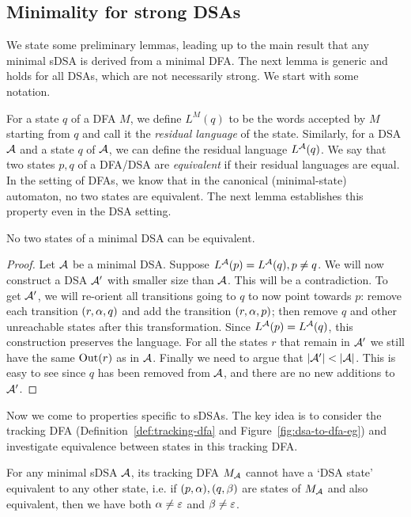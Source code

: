 \subsection{Minimality for strong DSAs}
\label{sec:sDSA-minimality}

 We state some preliminary lemmas, leading up to the main result that any minimal sDSA is derived from a minimal DFA. The next lemma is generic and holds for all DSAs, which are not necessarily strong. We start with some notation. 

 For a state $q$ of a DFA $M$, we define $L^M(q)$ to be the words accepted by $M$ starting from $q$ and call it the \emph{residual language} of the state. Similarly, for a DSA $\mathcal{A}$ and a state $q$ of $\mathcal{A}$, we can define the residual language $L^{\mathcal{A}}(q)$.
 We say that two states $p, q$ of a DFA/DSA are \emph{equivalent} if their residual languages are equal. In the setting of DFAs, we know that in the canonical (minimal-state) automaton, no two states are equivalent. The next lemma establishes this property even in the DSA setting.

\begin{lemma}\label{lem:minimal-dsa-no-equivalent-states}
No two states of a minimal DSA can be equivalent.
\end{lemma}

\begin{proof}
  Let $\mathcal{A}$ be a minimal DSA. Suppose 
  $L^{\mathcal{A}}(p) = L^{\mathcal{A}}(q), p \ne q$. We will
  now construct a DSA $\mathcal{A}'$ with smaller size
  than $\mathcal{A}$. This will be a contradiction. To get $\mathcal{A}'$, we will
  re-orient all transitions going to $q$ to now point towards $p$:
  remove each 
  transition $(r, \alpha, q)$ and add the transition $(r, \alpha, p)$; then
  remove $q$ and other unreachable states after this
  transformation. Since $L^{\mathcal{A}}(p) = L^{\mathcal{A}}(q)$, this construction
  preserves the language. For all the states $r$ that remain in $\mathcal{A}'$ we
  still have the same $\operatorname{Out}(r)$ as in $\mathcal{A}$. Finally we need to argue that $|\mathcal{A}'| <
  |\mathcal{A}|$. This is easy to see since $q$ has been removed from $\mathcal{A}$,
  and there are no new additions to $\mathcal{A}'$.
\end{proof}

   
Now we come to properties specific to sDSAs. The key idea is to consider the tracking DFA (Definition~\ref{def:tracking-dfa} and Figure~\ref{fig:dsa-to-dfa-eg}) and investigate equivalence between states in this tracking DFA. 

\begin{lemma}\label{lem:sdsa-equivalent-states}
For any minimal sDSA $\mathcal{A}$, its tracking DFA $M_{\mathcal{A}}$ cannot have a `DSA state' equivalent to any other state, i.e. if $(p,\alpha),(q,\beta)$ are states of $M_{\mathcal{A}}$ and also equivalent, then we have both $\alpha\ne\varepsilon$ and $\beta\ne\varepsilon$.
\end{lemma}

